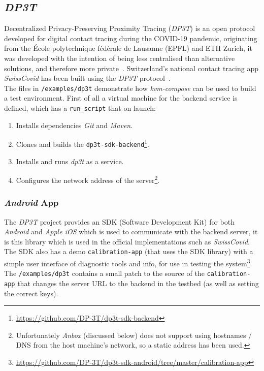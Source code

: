 \documentclass[
    author={Jacob Daniel Halsey},
    supervisor={Prof. Awais Rashid},
    degree={BSc},
    title={Building a Testbed for Evaluating Privacy Enhancing Technologies  (PETs)},
    subtitle={},
    type={software development},
    year={2021}
]{dissertation}
\begin{document}
\subsection{\emph{DP3T}}

Decentralized Privacy-Preserving Proximity Tracing (\emph{DP3T}) is an open protocol developed for
digital contact tracing during the COVID-19 pandemic, originating from the École polytechnique fédérale 
de Lausanne (EPFL) and ETH Zurich, it was developed with the intention of being less centralised
than alternative solutions, and therefore more private~\cite{busvine_2020}. 
Switzerland's national contact tracing app \emph{SwissCovid} 
has been built using the \emph{DP3T} protocol~\cite{swisscovid}. \\

The files in \texttt{/examples/dp3t} demonstrate how \emph{kvm-compose} can be used to build
a test environment. First of all a virtual machine for the backend service is defined,
which has a \texttt{run\_script} that on launch:

\begin{singlespace}
	\begin{enumerate}
		\item Installs dependencies \emph{Git} and \emph{Maven}.
		\item Clones and builds the 
		\texttt{dp3t-sdk-backend}\footnote{\url{https://github.com/DP-3T/dp3t-sdk-backend}}.
		\item Installs and runs \emph{dp3t} as a service.
		\item Configures the network address of the server\footnote{
			Unfortunately \emph{Anbox} (discussed below) does not support using hostnames / DNS from 
			the host machine's network, so a static address has been used.}.
	\end{enumerate}
\end{singlespace}

\subsubsection{\emph{Android} App}

The \emph{DP3T} project provides an SDK (Software Development Kit) 
for both \emph{Android} and \emph{Apple iOS} which
is used to communicate with the backend server, it is this library which is used in the official
implementations such as \emph{SwissCovid}. The SDK also has a demo \texttt{calibration-app} (that uses
the SDK library) with a simple user interface of diagnostic tools and info, for use in testing the 
system\footnote{\url{https://github.com/DP-3T/dp3t-sdk-android/tree/master/calibration-app}}.
The \texttt{/examples/dp3t} contains a small patch to the source of the \texttt{calibration-app} that
changes the server URL to the backend in the testbed (as well as setting the correct keys). \\
\end{document}
